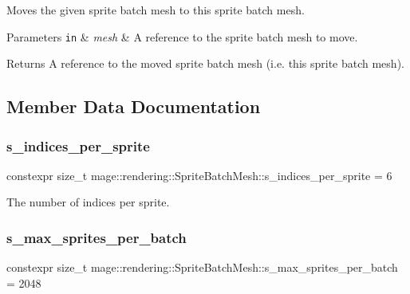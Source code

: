Moves the given sprite batch mesh to this sprite batch mesh.


\begin{DoxyParams}[1]{Parameters}
\mbox{\tt in}  & {\em mesh} & A reference to the sprite batch mesh to move. \\
\hline
\end{DoxyParams}
\begin{DoxyReturn}{Returns}
A reference to the moved sprite batch mesh (i.\+e. this sprite batch mesh). 
\end{DoxyReturn}


\subsection{Member Data Documentation}
\hypertarget{classmage_1_1rendering_1_1_sprite_batch_mesh_a94b84ac61872afa8caf150c781f3d740}{}\label{classmage_1_1rendering_1_1_sprite_batch_mesh_a94b84ac61872afa8caf150c781f3d740} 
\subsubsection{\texorpdfstring{s\+\_\+indices\+\_\+per\+\_\+sprite}{s\_indices\_per\_sprite}}
{\footnotesize\ttfamily constexpr size\+\_\+t mage\+::rendering\+::\+Sprite\+Batch\+Mesh\+::s\+\_\+indices\+\_\+per\+\_\+sprite = 6\hspace{0.3cm}{\ttfamily [static]}}

The number of indices per sprite. \hypertarget{classmage_1_1rendering_1_1_sprite_batch_mesh_a5f003dd97ee0c4aac0de37fcfd7b9889}{}\label{classmage_1_1rendering_1_1_sprite_batch_mesh_a5f003dd97ee0c4aac0de37fcfd7b9889} 
\subsubsection{\texorpdfstring{s\+\_\+max\+\_\+sprites\+\_\+per\+\_\+batch}{s\_max\_sprites\_per\_batch}}
{\footnotesize\ttfamily constexpr size\+\_\+t mage\+::rendering\+::\+Sprite\+Batch\+Mesh\+::s\+\_\+max\+\_\+sprites\+\_\+per\+\_\+batch = 2048\hspace{0.3cm}{\ttfamily [static]}}

